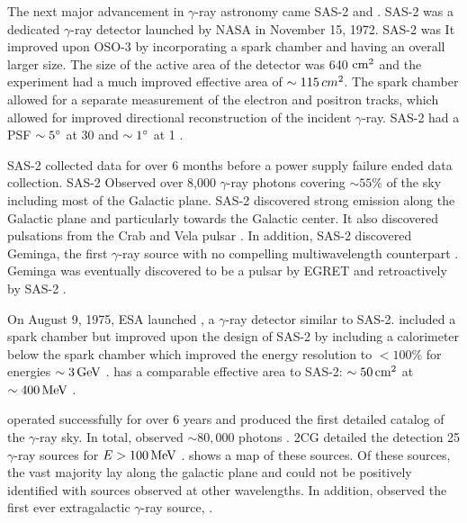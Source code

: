 The next major advancement in $\gamma$-ray astronomy came
\ac{SAS-2} and \cosb.  \Ac{SAS-2} was a dedicated $\gamma$-ray
detector launched by \ac{NASA} in November 15, 1972.  \ac{SAS-2} was
\cite{fichtel_1975_high-energy-gamma-ray} It improved upon \ac{OSO-3}
by incorporating a spark chamber and having an overall larger size.
The size of the active area of the detector was 640 $\text{cm}^2$ and the
experiment had a much improved effective area of $\sim 115\,
cm^2$. The spark chamber allowed for a separate measurement of the
electron and positron tracks, which allowed for improved directional
reconstruction of the incident $\gamma$-ray. \Ac{SAS-2} had a PSF
$\sim5^\circ$ at 30 \mev and $\sim1^\circ$ at 1 \gev.

\Ac{SAS-2} collected data for over 6 months before a power supply failure
ended data collection. \Ac{SAS-2} Observed over 8,000 $\gamma$-ray photons
covering $\sim55\%$ of the sky including most of the Galactic plane.
\Ac{SAS-2} discovered strong emission along the Galactic plane and
particularly towards the Galactic center. It also discovered pulsations
from the Crab \citep{fichtel_1975_high-energy-gamma-ray} and Vela
pulsar \citep{thompson_1977_sas-2-high-energy}.  In addition, \ac{SAS-2}
discovered Geminga, the first $\gamma$-ray source with no compelling
multiwavelength counterpart \citep{thompson_1977_final-sas-2}. Geminga
was eventually discovered to be a pulsar by \ac{EGRET}
\citep{bertsch_1992_pulsed-high-energy} and retroactively by \ac{SAS-2}
\citep{mattox_1992_observation-pulsed}.

On August 9, 1975, \ac{ESA} launched \cosb, a $\gamma$-ray detector
similar to \ac{SAS-2}.  \cosb included a spark chamber but improved upon
the design of \ac{SAS-2} by including a calorimeter below the spark
chamber which improved the energy resolution to $<100\%$ for energies
$\sim 3\,\text{GeV}$ \citep{bignami_1975_cos-b-experiment}.  \cosb has
a comparable effective area to \ac{SAS-2}: $\sim 50\,\text{cm}^2$
at $\sim400\,\text{MeV}$ \citep{bignami_1975_cos-b-experiment}.

\cosb operated successfully for over 6 years and produced the first
detailed catalog of the $\gamma$-ray sky.  In total, \cosb observed $\sim
80,000$ photons \cite{mayer-hasselwander_1982_large-scale-distribution}.
\Ac{2CG} detailed the detection 25 $\gamma$-ray sources for
$E>100\,\text{MeV}$ \citep{swanenburg_1981_second-catalog}.
 shows a map of these sources.  Of these sources,
the vast majority lay along the galactic plane and could not be positively
identified with sources observed at other wavelengths.  In addition,
\cosb observed the first ever extragalactic $\gamma$-ray source,
\citep[3C273,][]{swanenburg_1978_observation-high-energy}.

